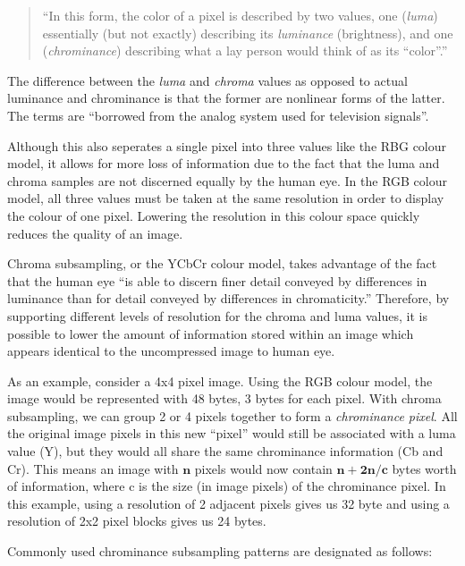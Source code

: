 \begin{quote}
``In this form, the color of a pixel is described by two values, 
one (\emph{luma}) essentially (but not exactly) describing its \emph{luminance} (brightness), and 
one (\emph{chrominance}) describing what a lay person would think of as its ``color''.''
\end{quote}

The difference between the \emph{luma} and \emph{chroma} values as opposed to actual luminance and chrominance is that 
the former are nonlinear forms of the latter. The terms are ``borrowed from the analog system used for television signals''. \cite{kerr_chroma_subsampling} 

Although this also seperates a single pixel into three values like the RBG colour model, 
it allows for more loss of information due to the fact that the luma and chroma samples are not discerned equally by the human eye. 
In the RGB colour model, all three values must be taken at the same resolution in order to display the colour of one pixel. 
Lowering the resolution in this colour space quickly reduces the quality of an image. 

Chroma subsampling, or the YCbCr colour model, takes advantage of the fact that the human eye 
``is able to discern finer detail conveyed by differences in luminance than for detail conveyed by differences in chromaticity.'' \cite{kerr_chroma_subsampling} 
Therefore, by supporting different levels of resolution for the chroma and luma values, 
it is possible to lower the amount of information stored within an image which appears identical to the uncompressed image to human eye.

As an example, consider a 4x4 pixel image. Using the RGB colour model, the image would be represented with 48 bytes, 3 bytes for each pixel. 
With chroma subsampling, we can group 2 or 4 pixels together to form a \emph{chrominance pixel}. 
All the original image pixels in this new ``pixel'' would still be associated with a luma value (Y), but 
they would all share the same chrominance information (Cb and Cr). 
This means an image with $\mathbf{n}$ pixels would now contain $\mathbf{n+2n/c}$ bytes worth of information, where 
c is the size (in image pixels) of the chrominance pixel. 
In this example, using a resolution of 2 adjacent pixels gives us 32 byte and using a resolution of 2x2 pixel blocks gives us 24 bytes.

Commonly used chrominance subsampling patterns are designated as follows:

